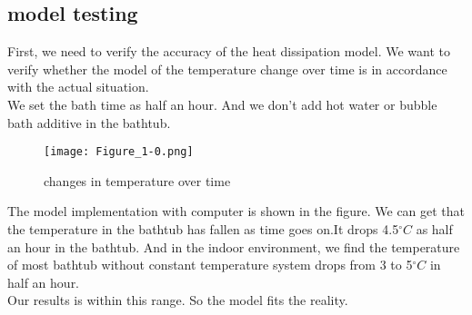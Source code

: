 \documentclass{mcmthesis}
\begin{document}
\subsection{model testing}			%
\indent First, we need to verify the accuracy of the heat dissipation model.
We want to verify whether the model of the temperature change over time is in accordance with the actual situation.\\
\indent We set the bath time as half an hour. And we don't add hot water or bubble bath additive in the bathtub. \\
\begin{figure}[H]
\centerline{\texttt{[image: Figure\_1-0.png]}}
\caption{changes in temperature over time}
\label{oval}	
\end{figure}
\indent The model implementation with computer is shown in the figure.
We can get that the temperature in the bathtub has fallen as time goes on.It drops 4.5$^{\circ}C$ as half an hour in the bathtub. And in the indoor environment, we find the temperature of most bathtub without constant temperature system drops from 3 to 5$^{\circ}C$ in half an hour. \\ \indent Our results is within this range. So the model fits the reality.               
\end{document}
